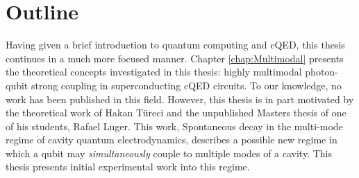 \documentclass[11 pt, oneside]{book} %
\begin{document}
%




\section{Outline}
Having given a brief introduction to quantum computing and cQED, this thesis continues in a much more focused manner. Chapter \ref{chap:Multimodal} presents the theoretical concepts investigated in this thesis: highly multimodal photon-qubit strong coupling in superconducting cQED circuits. To our knowledge, no work has been published in this field. However, this thesis is in part motivated by the theoretical work of Hakan T\"{u}reci and the unpublished Masters thesis of one of his students, Rafael Luger\cite{Luger}. This work, Spontaneous decay in the multi-mode regime of cavity quantum electrodynamics, describes a possible new regime in which a qubit may \emph{simultaneously} couple to multiple modes of a cavity. This thesis presents initial experimental work into this regime. 
\end{document}
